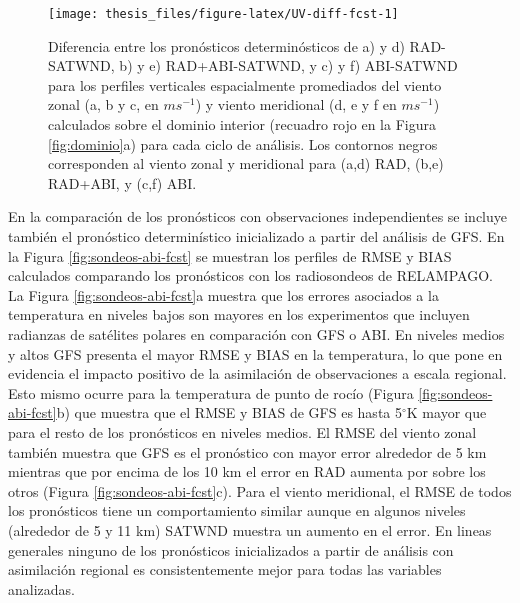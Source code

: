 \documentclass[12pt,oneside,a4paper]{reedthesis}
\begin{document}
\begin{figure}

\texttt{[image: thesis\_files/figure-latex/UV-diff-fcst-1]} \hfill{}

\caption{Diferencia entre los pronósticos determinósticos de a) y d) RAD-SATWND, b) y e) RAD+ABI-SATWND, y c) y f) ABI-SATWND para los perfiles verticales espacialmente promediados del viento zonal (a, b y c, en \(ms^{-1}\)) y viento meridional (d, e y f en \(ms^{-1}\)) calculados sobre el dominio interior (recuadro rojo en la Figura \ref{fig:dominio}a) para cada ciclo de análisis. Los contornos negros corresponden al viento zonal y meridional para (a,d) RAD, (b,e) RAD+ABI, y (c,f) ABI.}\label{fig:UV-diff-fcst}
\end{figure}
En la comparación de los pronósticos con observaciones independientes se incluye también el pronóstico determinístico inicializado a partir del análisis de GFS. En la Figura \ref{fig:sondeos-abi-fcst} se muestran los perfiles de RMSE y BIAS calculados comparando los pronósticos con los radiosondeos de RELAMPAGO. La Figura \ref{fig:sondeos-abi-fcst}a muestra que los errores asociados a la temperatura en niveles bajos son mayores en los experimentos que incluyen radianzas de satélites polares en comparación con GFS o ABI. En niveles medios y altos GFS presenta el mayor RMSE y BIAS en la temperatura, lo que pone en evidencia el impacto positivo de la asimilación de observaciones a escala regional. Esto mismo ocurre para la temperatura de punto de rocío (Figura \ref{fig:sondeos-abi-fcst}b) que muestra que el RMSE y BIAS de GFS es hasta 5\(^\circ\)K mayor que para el resto de los pronósticos en niveles medios. El RMSE del viento zonal también muestra que GFS es el pronóstico con mayor error alrededor de 5 km mientras que por encima de los 10 km el error en RAD aumenta por sobre los otros (Figura \ref{fig:sondeos-abi-fcst}c). Para el viento meridional, el RMSE de todos los pronósticos tiene un comportamiento similar aunque en algunos niveles (alrededor de 5 y 11 km) SATWND muestra un aumento en el error. En lineas generales ninguno de los pronósticos inicializados a partir de análisis con asimilación regional es consistentemente mejor para todas las variables analizadas.
\end{document}
